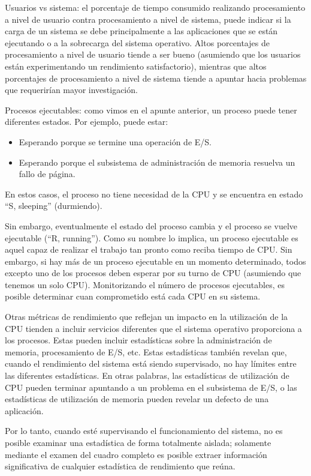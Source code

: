\documentclass[12pt]{article}
\begin{document}
Usuarios vs sistema: el porcentaje de tiempo consumido realizando 
procesamiento a nivel de usuario contra procesamiento a nivel de sistema, 
puede indicar si la carga de un sistema se debe principalmente a las 
aplicaciones que se están ejecutando o a la sobrecarga del sistema 
operativo. Altos porcentajes de procesamiento a nivel de usuario tiende a 
ser bueno (asumiendo que los usuarios están experimentando un rendimiento
satisfactorio), mientras que altos porcentajes de procesamiento a nivel de 
sistema tiende a apuntar hacia problemas que requerirían mayor 
investigación.

Procesos ejecutables: como vimos en el apunte anterior, un proceso puede 
tener diferentes estados. Por ejemplo, puede estar:
\begin{itemize}
\item Esperando porque se termine una operación de E/S.
\item Esperando porque el subsistema de administración de memoria 
resuelva un fallo de página.
\end{itemize}
En estos casos, el proceso no tiene necesidad de la CPU y se encuentra en
estado ``S, sleeping'' (durmiendo).  

Sin embargo, eventualmente el estado del proceso cambia y el proceso se 
vuelve ejecutable (``R, running''). Como su nombre lo implica, un proceso 
ejecutable es aquel capaz de realizar el trabajo tan pronto como reciba 
tiempo de CPU. Sin embargo, si hay más de un proceso ejecutable en un 
momento determinado, todos excepto uno de los procesos deben esperar por su 
turno de CPU (asumiendo que tenemos un solo CPU). Monitorizando el
número de procesos ejecutables, es posible determinar cuan comprometido 
está cada CPU en su sistema.

Otras métricas de rendimiento que reflejan un impacto en la utilización 
de la CPU tienden a incluir servicios diferentes que el sistema operativo 
proporciona a los procesos. Estas pueden incluir estadísticas sobre la 
administración de memoria, procesamiento de E/S, etc. Estas estadísticas 
también revelan que, cuando el rendimiento del sistema está siendo 
supervisado, no hay límites entre las diferentes estadísticas. En otras 
palabras, las estadísticas de utilización de CPU pueden terminar apuntando 
a un problema en el subsistema de E/S, o las estadísticas de utilización 
de memoria pueden revelar un defecto de una aplicación.

Por lo tanto, cuando esté supervisando el funcionamiento del sistema, no 
es posible examinar una estadística de forma totalmente aislada; solamente
mediante el examen del cuadro completo es posible extraer información 
significativa de cualquier estadística de rendimiento que reúna.
\end{document}
